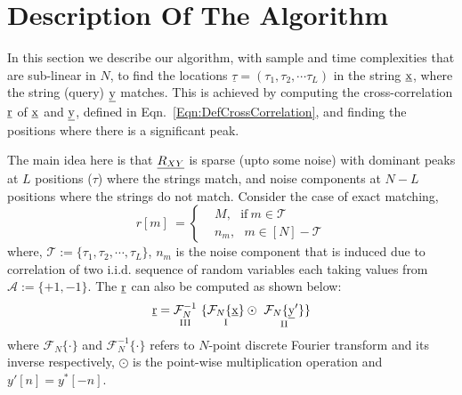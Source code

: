 \section{Description Of The Algorithm}
In this section we describe our algorithm, with sample and time complexities that are sub-linear in $N$, to find the locations $\underline{\tau} = (\tau_1, \tau_2, \cdots \tau_L)$ in the string $\underline{\mathrm{x}}$, where the string (query) $\underline{\mathrm{y}}$ matches. This is achieved by computing the cross-correlation $\underline{\mathrm{r}}$ of $\underline{\mathrm{x}}$ and $\underline{\mathrm{y}}$, defined in Eqn.~\eqref{Eqn:DefCrossCorrelation}, and finding the positions where there is a significant peak. 
%

The main idea here is that $\underline{R_{XY}}$ is sparse (upto some noise) with dominant peaks at $L$ positions ($\tau$) where the strings match, and noise components at $N-L$ positions where the strings do not match. Consider the case of exact matching,
\begin{equation} \label{eqn:RXY_sparse}
r[m] \ = \left\{
\begin{array}{ll}
  &M , \ \ \  \text{if} \ m \in \mathcal{T} \\
  & n_m , \ \ \ m \in [N]-\mathcal{T}
\end{array} 
\right.  
\end{equation}
where, $ \mathcal{T}:=\{\tau_1, \tau_2, \cdots, \tau_L\}$,
 $n_m$ is the noise component that is induced due to correlation of two i.i.d. sequence of random variables each taking values from $\mathcal{A} := \{+1,-1\}$. The $\underline{\mathrm{r}}$ can also be computed as shown below:
\begin{equation}\label{eqn:Rxy_fourier}
  \rv = \underset{\text{ \RNum{3} } } {\mathcal{F}_{N}^{-1}} \ \{ \underset{\text{ \RNum{1} } }{  \mathcal{F}_{N}\{\xv\}}  \odot \ \underset{\text{ \RNum{2} } }{ \mathcal{F}_{N}\{\yv'\}}  \} 
\end{equation} 
where $\mathcal{F}_{N}\{ \cdot \}$ and $\mathcal{F}_{N}^{-1}\{ \cdot \}$ refers to $N$-point discrete Fourier transform and its inverse respectively, $\odot$ is the point-wise multiplication operation and ${ y'[n]} = { y^{*}[-n]}$. 


